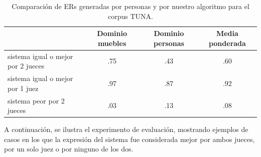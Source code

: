 \begin{table}[H]
\begin{table}[h!]
\begin{center}
\begin{tabular}{|l|c|c|c|}
\hline
 & Dominio muebles & Dominio personas & Media ponderada \\
\hline
sistema igual o mejor por 2 jueces  &.75  &       .43	&       .60 \\
sistema igual o mejor por 1 juez  &.97	&	.87	&	.92 \\
sistema peor por 2 jueces &	.03	&	.13	&	.08 \\
\hline
\end{tabular}
\caption{Comparaci\'on de ERs generadas por personas y por nuestro algoritmo para el corpus TUNA.} 
\label{system-versus-human}
\vspace*{-.5cm}
\end{center}
\end{table}



A continuaci\'on, se ilustra el experimento de evaluaci\'on, mostrando ejemplos de casos en los que la expresi\'on del sistema fue considerada mejor por ambos jueces, por un solo juez o por ninguno de los dos.


\end{table}
